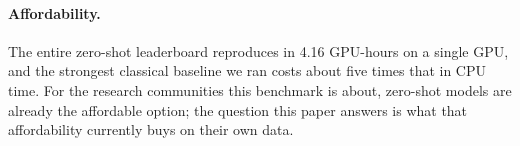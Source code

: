 \paragraph{Affordability.} The entire zero-shot leaderboard reproduces in 4.16 GPU-hours on a single GPU, and the
strongest classical baseline we ran costs about five times that in CPU time. For the research communities this
benchmark is about, zero-shot models are already the affordable option; the question this paper answers is what
that affordability currently buys on their own data.
